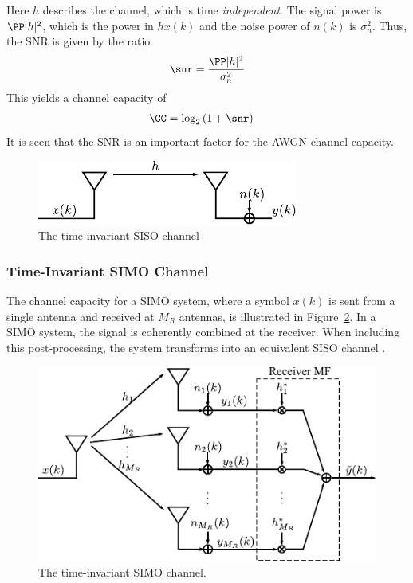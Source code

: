 Here $h$ describes the channel, which is time \emph{independent}. The signal power is $\PP |h|^2$, which is the power in $h x(k)$ and the noise power of $n(k)$ is $\sigma_n^2$. Thus, the SNR is given by the ratio \cite{Tim2012Practical}
\begin{align} %
  \snr = \frac{\PP |h|^2}{\sigma_n^2}
\end{align}
This yields a channel capacity of \cite{Tim2012Practical} 
\begin{align} %
      \CC &= \log_2 \left( 1 + \snr \right)
\end{align}
It is seen that the SNR is an important factor for the AWGN channel capacity.
\begin{figure}[hbp]
  \centering
  \includegraphics[scale=1.2]{img/analysis/sisoModel}
  \caption{The time-invariant SISO channel}
  \label{fig:sisoModel}
\end{figure}

\subsubsection{Time-Invariant SIMO Channel}
The channel capacity for a SIMO system, where a symbol $x(k)$ is sent from a single antenna and received at $M_R$ antennas, is illustrated in Figure~\ref{fig:simoModel}. In a SIMO system, the signal is coherently combined at the receiver. When including this post-processing, the system transforms into an equivalent SISO channel \cite{Tim2012Practical}.

\begin{figure}[htbp]
  \centering
  \includegraphics[scale=1.2]{img/analysis/simoModel}
  \caption{The time-invariant SIMO channel.}
  \label{fig:simoModel}
\end{figure}

